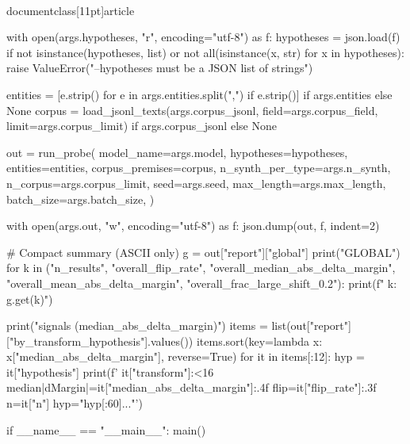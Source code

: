 \\documentclass[11pt]{article}
\begin{document}
\begin{CodeBlock}
    with open(args.hypotheses, "r", encoding="utf-8") as f:
        hypotheses = json.load(f)
    if not isinstance(hypotheses, list) or not all(isinstance(x, str) for x in hypotheses):
        raise ValueError("--hypotheses must be a JSON list of strings")

    entities = [e.strip() for e in args.entities.split(",") if e.strip()] if args.entities else None
    corpus = load_jsonl_texts(args.corpus_jsonl, field=args.corpus_field, limit=args.corpus_limit) if args.corpus_jsonl else None

    out = run_probe(
        model_name=args.model,
        hypotheses=hypotheses,
        entities=entities,
        corpus_premises=corpus,
        n_synth_per_type=args.n_synth,
        n_corpus=args.corpus_limit,
        seed=args.seed,
        max_length=args.max_length,
        batch_size=args.batch_size,
    )

    with open(args.out, "w", encoding="utf-8") as f:
        json.dump(out, f, indent=2)

    # Compact summary (ASCII only)
    g = out["report"]["global"]
    print("GLOBAL")
    for k in ("n_results", "overall_flip_rate", "overall_median_abs_delta_margin", "overall_mean_abs_delta_margin", "overall_frac_large_shift_0.2"):
        print(f"  {k}: {g.get(k)}")

    print("\nTOP signals (median_abs_delta_margin)")
    items = list(out["report"]["by_transform_hypothesis"].values())
    items.sort(key=lambda x: x["median_abs_delta_margin"], reverse=True)
    for it in items[:12]:
        hyp = it["hypothesis"]
        print(f'  {it["transform"]:<16} median|dMargin|={it["median_abs_delta_margin"]:.4f} flip={it["flip_rate"]:.3f} n={it["n"]} hyp="{hyp[:60]}..."')


if __name__ == "__main__":
    main()

\end{CodeBlock}
\end{document}
